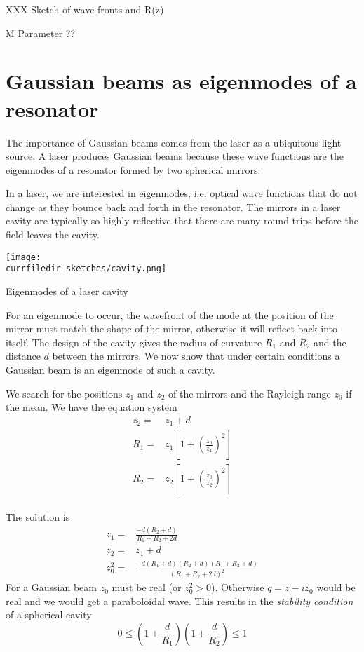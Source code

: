 XXX Sketch of wave fronts and R(z)

M Parameter ??


\section{Gaussian beams as eigenmodes of a resonator}
The importance of Gaussian beams comes from the laser as a ubiquitous light source. A laser produces Gaussian beams because these wave functions are the eigenmodes of a resonator formed by two spherical mirrors.

In a laser, we are interested in eigenmodes, i.e. optical wave functions that do not change as they bounce back and forth in the resonator. The mirrors in a laser cavity are typically so highly reflective that there are many round trips before the field leaves the cavity.


\begin{marginfigure}
    \texttt{[image: \\currfiledir sketches/cavity.png]}
   \caption{Eigenmodes of a laser cavity}
\end{marginfigure}


For an eigenmode to occur, the wavefront of the mode at the position of the mirror must match the shape of the mirror, otherwise it will reflect back into itself. The design of the cavity gives the radius of curvature $R_1$ and $R_2$ and the distance $d$ between the mirrors. We now show that under certain conditions a Gaussian beam is an eigenmode of such a cavity.

We search for the positions $z_1$ and $z_2$ of the mirrors and the Rayleigh range $z_0$ if the mean. We have the equation system
\begin{align}
    z_2 = & z_1 + d \\
    R_1 = & z_1 \left[ 1 + \left( \frac{z_0}{z_1} \right)^2 \right] \\
    R_2 = & z_2 \left[ 1 + \left( \frac{z_0}{z_2} \right)^2 \right] \\
\end{align}

The solution is
\begin{align}
    z_1 = & \frac{-d (R_2 + d)}{R_1 + R_2 + 2d} \\
    z_2 = &z_1 + d  \\
    z_0^2 = & \frac{-d (R_1 +d)(R_2 + d)(R_1 + R_2 +d)}{(R_1 + R_2 + 2d)^2}
\end{align}
For a Gaussian beam $z_0$ must be real (or $z_0^2 > 0$). Otherwise $q = z - i z_0$ would be real and we would get a paraboloidal wave. This results in the \emph{stability condition} of a spherical cavity
\begin{equation}
    0 \le \left( 1 + \frac{d}{R_1} \right) \left( 1 + \frac{d}{R_2} \right) \le 1
\end{equation}

